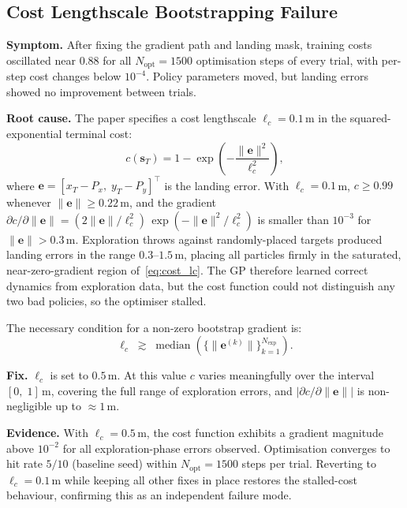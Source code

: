 \subsection{Cost Lengthscale Bootstrapping Failure}
\label{sec:fix_lc}

\textbf{Symptom.}
After fixing the gradient path and landing mask, training costs oscillated near $0.88$
for all $N_{\mathrm{opt}} = 1500$ optimisation steps of every trial, with
per-step cost changes below $10^{-4}$.
Policy parameters moved, but landing errors showed no improvement between trials.

\textbf{Root cause.}
The paper specifies a cost lengthscale $\ell_c = 0.1$\,m in the squared-exponential
terminal cost:
\begin{equation}
  c(\mathbf{s}_T) = 1 - \exp\!\left(-\frac{\|\mathbf{e}\|^2}{\ell_c^2}\right),
  \label{eq:cost_lc}
\end{equation}
where $\mathbf{e} = [x_T - P_x,\; y_T - P_y]^\top$ is the landing error.
With $\ell_c = 0.1$\,m, $c \geq 0.99$ whenever $\|\mathbf{e}\| \geq 0.22$\,m, and
the gradient $\partial c / \partial \|\mathbf{e}\| = (2\|\mathbf{e}\|/\ell_c^2)\,
\exp(-\|\mathbf{e}\|^2/\ell_c^2)$ is smaller than $10^{-3}$ for
$\|\mathbf{e}\| > 0.3$\,m.
Exploration throws against randomly-placed targets produced landing errors in the
range $0.3$--$1.5$\,m, placing all particles firmly in the saturated,
near-zero-gradient region of~\eqref{eq:cost_lc}.
The GP therefore learned correct dynamics from exploration data, but the cost
function could not distinguish any two bad policies, so the optimiser stalled.

The necessary condition for a non-zero bootstrap gradient is:
\begin{equation}
  \ell_c \;\gtrsim\; \operatorname{median}\!\left(\{\|\mathbf{e}^{(k)}\|\}_{k=1}^{N_{\mathrm{exp}}}\right).
  \label{eq:lc_rule}
\end{equation}

\textbf{Fix.}
$\ell_c$ is set to $0.5$\,m.
At this value $c$ varies meaningfully over the interval $[0,\;1]$\,m, covering the
full range of exploration errors, and $|\partial c / \partial \|\mathbf{e}\||$ is
non-negligible up to $\approx 1$\,m.

\textbf{Evidence.}
With $\ell_c = 0.5$\,m, the cost function exhibits a gradient magnitude above
$10^{-2}$ for all exploration-phase errors observed.
Optimisation converges to hit rate $5/10$ (baseline seed) within
$N_{\mathrm{opt}} = 1500$ steps per trial.
Reverting to $\ell_c = 0.1$\,m while keeping all other fixes in place restores the
stalled-cost behaviour, confirming this as an independent failure mode.

